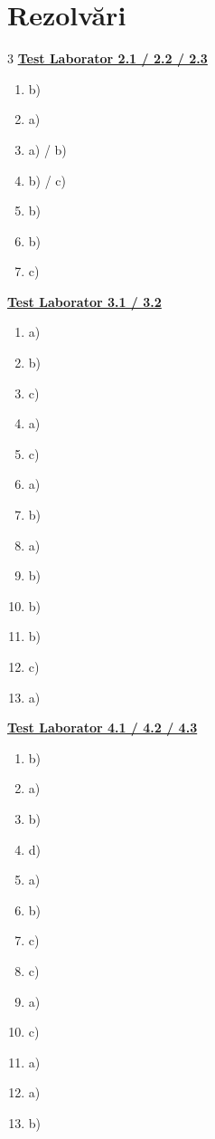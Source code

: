 \documentclass[12pt,a4paper]{article}
\begin{document}
\section{Rezolvări} \label{sec:rezolvari}
\begin{multicols}{3}
\hyperref[sec:lab2]{\textbf{Test Laborator 2.1 / 2.2 / 2.3}}
\begin{enumerate}
    \item b) %
    \item a) %
    \item a) / b) %
    \item b) / c) %
    \item b) %
    \item b) %
    \item c) %
\end{enumerate}
\vfill\null\columnbreak
\hyperref[sec:lab3]{\textbf{Test Laborator 3.1 / 3.2}}
\begin{enumerate}
    \item a) %
    \item b) %
    \item c) %
    \item a) %
    \item c) %
    \item a) %
    \item b) %
    \item a) %
    \item b) %
    \item b) %
    \item b) %
    \item c) %
    \item a) %
\end{enumerate}
\vfill\null\columnbreak
\hyperref[sec:lab4]{\textbf{Test Laborator 4.1 / 4.2 / 4.3}}
\begin{enumerate}
    \item b) %
    \item a) %
    \item b) %
    \item d) %
    \item a) %
    \item b) %
    \item c) %
    \item c) %
    \item a) %
    \item c) %
    \item a) %
    \item a) %
    \item b) %
\end{enumerate}

\end{multicols}

\end{document}
